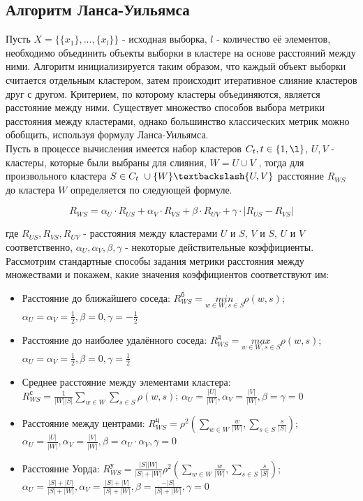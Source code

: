 \begin{itemize}
\section*{Алгоритм Ланса-Уильямса}

Пусть $X = \{\{x_1\},..., \{x_l\}\}$ - исходная выборка, $l$ - количество её элементов, необходимо объединить объекты выборки в кластере на основе расстояний между ними. Алгоритм инициализируется таким образом, что каждый объект выборки считается отдельным кластером, затем происходит итеративное слияние кластеров друг с другом. Критерием, по которому кластеры объединяются, является расстояние между ними. %
Существует множество способов выбора метрики расстояния между кластерами, однако большинство классических метрик можно обобщить, используя формулу Ланса-Уильямса.\\
Пусть в процессе вычисления имеется набор кластеров $C_t,t \in \{1, \l\}$, $U, V$ - кластеры, которые были выбраны для слияния, $W = U \cup V$ , тогда для произвольного кластера $S \in C_t\ \cup \{W\} \textbackslash \{U, V\}$ расстояние $R_{WS}$ до кластера $W$ определяется по следующей формуле.

\begin{equation*}
        R_{WS} = \alpha_U \cdot R_{US} + \alpha_V \cdot R_{VS} + \beta \cdot R_{UV} + \gamma \cdot |R_{US} - R_{VS}|
\end{equation*}

где $R_{US}, R_{VS}, R_{UV}$ - расстояния между кластерами $U$ и $S$, $V$ и $S$, $U$ и $V$ соответственно, $\alpha_U, \alpha_V, \beta, \gamma$ - некоторые действительные коэффициенты. Рассмотрим стандартные способы задания метрики расстояния между множествами и покажем, какие значения коэффициентов соответствуют им:

\begin{itemize}
    \item Расстояние до ближайшего соседа: $R^{\text{б}}_{WS} = \underset{w \in W, s \in S}{min}
  \rho (w, s)$; $\alpha_U = \alpha_V = \frac{1}{2}, \beta = 0, \gamma = - \frac{1}{2}$
    \item Расстояние до наиболее удалённого соседа: $R^{\text{д}}_{WS} = \underset{w \in W, s \in S}{max} \rho (w, s)$; $\alpha_U = \alpha_V = \frac{1}{2}, \beta = 0, \gamma = \frac{1}{2}$
    \item Среднее расстояние между элементами кластера: $R^{\text {с}}_{WS} = \frac{1}{|W||S|} \sum_{w \in W} \sum_{s \in S} \rho (w, s)$; $\alpha_U = \frac{|U|}{|W|}, \alpha_V = \frac{|V|}{|W|}, \beta = \gamma = 0$
    \item Расстояние между центрами: $R^{\text{ц}}_{WS} = \rho^2 \left( \sum_{w \in W} \frac{w}{|W|}, \sum_{s \in S} \frac{s}{|S|} \right)$; $\alpha_U = \frac{|U|}{|W|}, \alpha_V = \frac{|V|}{|W|}, \beta = \alpha_U \cdot \alpha_V, \gamma = 0$
    \item Расстояние Уорда: $R^{\text{у}}_{WS} = \frac{|S||W|}{|S|+|W|} \rho^2 \left( \sum_{w \in W} \frac{w}{|W|}, \sum_{s \in S} \frac{s}{|S|} \right)$; $\alpha_U = \frac{|S| + |U|}{|S|+|W|}, \alpha_V = \frac{|S|+|V|}{|S|+|W|}, \beta = \frac{-|S|}{|S|+|W|}, \gamma = 0$
\end{itemize}


\end{itemize}
